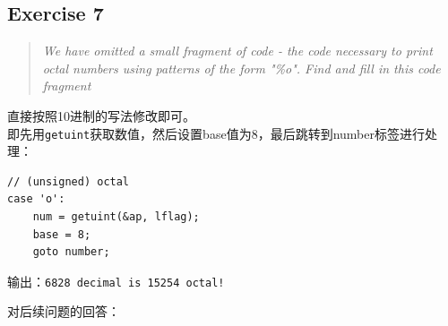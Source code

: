\subsection{Exercise 7}
\begin{quote} \textit{We have omitted a small fragment of code - the code necessary to print octal numbers using patterns of the form "\%o". Find and fill in this code fragment} \end{quote}

直接按照10进制的写法修改即可。\\

即先用\lstinline{getuint}获取数值，然后设置base值为8，最后跳转到number标签进行处理：\\
\begin{lstlisting}
// (unsigned) octal
case 'o':
    num = getuint(&ap, lflag);
    base = 8;
    goto number;
\end{lstlisting}

输出：\lstinline{6828 decimal is 15254 octal!}

对后续问题的回答：

